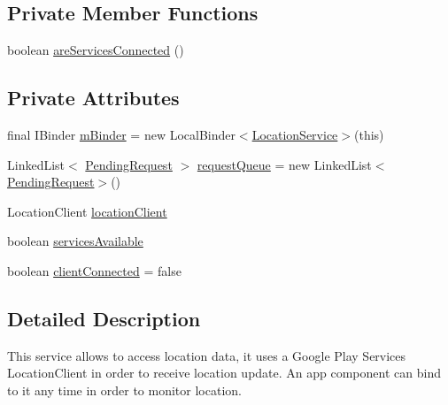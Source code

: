\subsection*{Private Member Functions}
\begin{DoxyCompactItemize}
\item 
boolean \hyperlink{classcom_1_1qualoutdoor_1_1recorder_1_1location_1_1LocationService_ad7f15b2d5c83c7034cdd4f00812cb9e4}{are\-Services\-Connected} ()
\end{DoxyCompactItemize}
\subsection*{Private Attributes}
\begin{DoxyCompactItemize}
\item 
final I\-Binder \hyperlink{classcom_1_1qualoutdoor_1_1recorder_1_1location_1_1LocationService_adedcf04f6459e4109593aec315902c3f}{m\-Binder} = new Local\-Binder$<$\hyperlink{classcom_1_1qualoutdoor_1_1recorder_1_1location_1_1LocationService}{Location\-Service}$>$(this)
\item 
Linked\-List$<$ \hyperlink{classcom_1_1qualoutdoor_1_1recorder_1_1location_1_1LocationService_1_1PendingRequest}{Pending\-Request} $>$ \hyperlink{classcom_1_1qualoutdoor_1_1recorder_1_1location_1_1LocationService_a1be76c7931903a411c5973db4a5185fd}{request\-Queue} = new Linked\-List$<$\hyperlink{classcom_1_1qualoutdoor_1_1recorder_1_1location_1_1LocationService_1_1PendingRequest}{Pending\-Request}$>$()
\item 
Location\-Client \hyperlink{classcom_1_1qualoutdoor_1_1recorder_1_1location_1_1LocationService_ac762380166c206994d17c087bc1c8fe1}{location\-Client}
\item 
boolean \hyperlink{classcom_1_1qualoutdoor_1_1recorder_1_1location_1_1LocationService_af905331a32eb5230aadc45d89a751a13}{services\-Available}
\item 
boolean \hyperlink{classcom_1_1qualoutdoor_1_1recorder_1_1location_1_1LocationService_ae629a0993db046efe7f90bd59f02dcfa}{client\-Connected} = false
\end{DoxyCompactItemize}


\subsection{Detailed Description}
This service allows to access location data, it uses a Google Play Services Location\-Client in order to receive location update. An app component can bind to it any time in order to monitor location.

